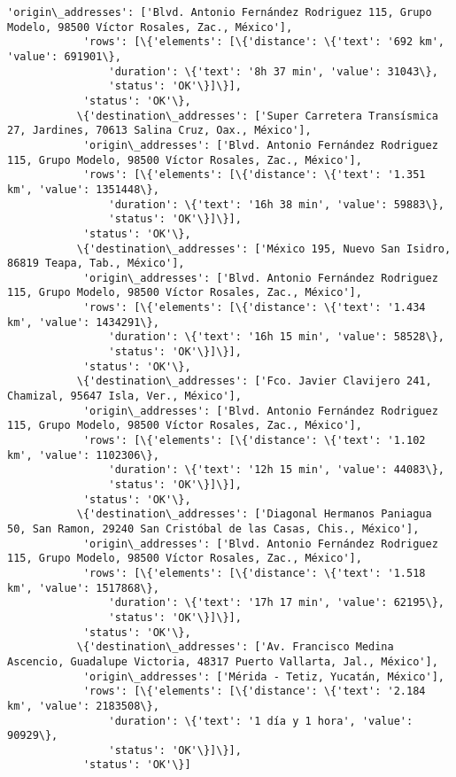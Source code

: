 \documentclass[11pt]{article}
\begin{document}
\begin{Verbatim}[commandchars=\\\{\}]
            'origin\_addresses': ['Blvd. Antonio Fernández Rodriguez 115, Grupo Modelo, 98500 Víctor Rosales, Zac., México'],
            'rows': [\{'elements': [\{'distance': \{'text': '692 km', 'value': 691901\},
                'duration': \{'text': '8h 37 min', 'value': 31043\},
                'status': 'OK'\}]\}],
            'status': 'OK'\},
           \{'destination\_addresses': ['Super Carretera Transísmica 27, Jardines, 70613 Salina Cruz, Oax., México'],
            'origin\_addresses': ['Blvd. Antonio Fernández Rodriguez 115, Grupo Modelo, 98500 Víctor Rosales, Zac., México'],
            'rows': [\{'elements': [\{'distance': \{'text': '1.351 km', 'value': 1351448\},
                'duration': \{'text': '16h 38 min', 'value': 59883\},
                'status': 'OK'\}]\}],
            'status': 'OK'\},
           \{'destination\_addresses': ['México 195, Nuevo San Isidro, 86819 Teapa, Tab., México'],
            'origin\_addresses': ['Blvd. Antonio Fernández Rodriguez 115, Grupo Modelo, 98500 Víctor Rosales, Zac., México'],
            'rows': [\{'elements': [\{'distance': \{'text': '1.434 km', 'value': 1434291\},
                'duration': \{'text': '16h 15 min', 'value': 58528\},
                'status': 'OK'\}]\}],
            'status': 'OK'\},
           \{'destination\_addresses': ['Fco. Javier Clavijero 241, Chamizal, 95647 Isla, Ver., México'],
            'origin\_addresses': ['Blvd. Antonio Fernández Rodriguez 115, Grupo Modelo, 98500 Víctor Rosales, Zac., México'],
            'rows': [\{'elements': [\{'distance': \{'text': '1.102 km', 'value': 1102306\},
                'duration': \{'text': '12h 15 min', 'value': 44083\},
                'status': 'OK'\}]\}],
            'status': 'OK'\},
           \{'destination\_addresses': ['Diagonal Hermanos Paniagua 50, San Ramon, 29240 San Cristóbal de las Casas, Chis., México'],
            'origin\_addresses': ['Blvd. Antonio Fernández Rodriguez 115, Grupo Modelo, 98500 Víctor Rosales, Zac., México'],
            'rows': [\{'elements': [\{'distance': \{'text': '1.518 km', 'value': 1517868\},
                'duration': \{'text': '17h 17 min', 'value': 62195\},
                'status': 'OK'\}]\}],
            'status': 'OK'\},
           \{'destination\_addresses': ['Av. Francisco Medina Ascencio, Guadalupe Victoria, 48317 Puerto Vallarta, Jal., México'],
            'origin\_addresses': ['Mérida - Tetiz, Yucatán, México'],
            'rows': [\{'elements': [\{'distance': \{'text': '2.184 km', 'value': 2183508\},
                'duration': \{'text': '1 día y 1 hora', 'value': 90929\},
                'status': 'OK'\}]\}],
            'status': 'OK'\}]
\end{Verbatim}
            
\end{document}
